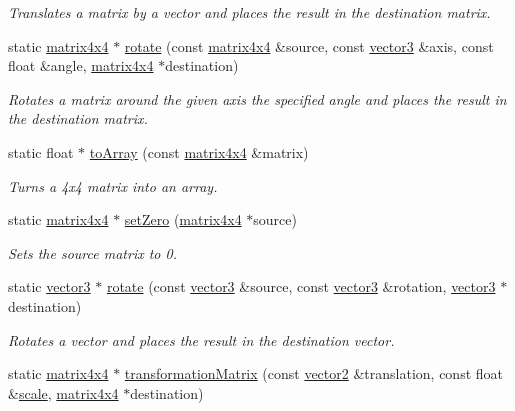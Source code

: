 \begin{DoxyCompactItemize}
\begin{DoxyCompactList}\small\item\em Translates a matrix by a vector and places the result in the destination matrix. \end{DoxyCompactList}\item 
static \hyperlink{classflounder_1_1matrix4x4}{matrix4x4} $\ast$ \hyperlink{classflounder_1_1matrix4x4_a609091aacfd80ea7ad75dd1c4d14b837}{rotate} (const \hyperlink{classflounder_1_1matrix4x4}{matrix4x4} \&source, const \hyperlink{classflounder_1_1vector3}{vector3} \&axis, const float \&angle, \hyperlink{classflounder_1_1matrix4x4}{matrix4x4} $\ast$destination)
\begin{DoxyCompactList}\small\item\em Rotates a matrix around the given axis the specified angle and places the result in the destination matrix. \end{DoxyCompactList}\item 
static float $\ast$ \hyperlink{classflounder_1_1matrix4x4_a5eaea900736fe16138c0380b4e9c4786}{to\+Array} (const \hyperlink{classflounder_1_1matrix4x4}{matrix4x4} \&matrix)
\begin{DoxyCompactList}\small\item\em Turns a 4x4 matrix into an array. \end{DoxyCompactList}\item 
static \hyperlink{classflounder_1_1matrix4x4}{matrix4x4} $\ast$ \hyperlink{classflounder_1_1matrix4x4_ab9f73c85d8b8844435858aafbf99d5d7}{set\+Zero} (\hyperlink{classflounder_1_1matrix4x4}{matrix4x4} $\ast$source)
\begin{DoxyCompactList}\small\item\em Sets the source matrix to 0. \end{DoxyCompactList}\item 
static \hyperlink{classflounder_1_1vector3}{vector3} $\ast$ \hyperlink{classflounder_1_1matrix4x4_abdc18b84f279431e1c137a7dd42cac2b}{rotate} (const \hyperlink{classflounder_1_1vector3}{vector3} \&source, const \hyperlink{classflounder_1_1vector3}{vector3} \&rotation, \hyperlink{classflounder_1_1vector3}{vector3} $\ast$destination)
\begin{DoxyCompactList}\small\item\em Rotates a vector and places the result in the destination vector. \end{DoxyCompactList}\item 
static \hyperlink{classflounder_1_1matrix4x4}{matrix4x4} $\ast$ \hyperlink{classflounder_1_1matrix4x4_a48a7a03e0cf3618a745cb9265b15575f}{transformation\+Matrix} (const \hyperlink{classflounder_1_1vector2}{vector2} \&translation, const float \&\hyperlink{classflounder_1_1matrix4x4_ad7f8cccba89862a3f574b601f0744174}{scale}, \hyperlink{classflounder_1_1matrix4x4}{matrix4x4} $\ast$destination)

\end{DoxyCompactItemize}
